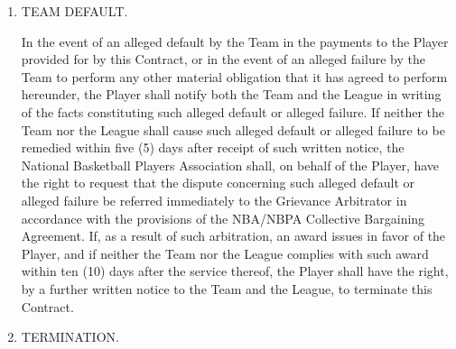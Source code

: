 \documentclass[
]{book}
\begin{document}
\begin{enumerate}
\def\labelenumi{\arabic{enumi}.}
\setcounter{enumi}{14}
\item
  TEAM DEFAULT.

  In the event of an alleged default by the Team in the payments to the Player provided for by this Contract, or in the event of an alleged failure by the Team to perform any other material obligation that it has agreed to perform hereunder, the Player shall notify both the Team and the League in writing of the facts constituting such alleged default or alleged failure. If neither the Team nor the League shall cause such alleged default or alleged failure to be remedied within five (5) days after receipt of such written notice, the National Basketball Players Association shall, on behalf of the Player, have the right to request that the dispute concerning such alleged default or alleged failure be referred immediately to the Grievance Arbitrator in accordance with the provisions of the NBA/NBPA Collective Bargaining Agreement. If, as a result of such arbitration, an award issues in favor of the Player, and if neither the Team nor the League complies with such award within ten (10) days after the service thereof, the Player shall have the right, by a further written notice to the Team and the League, to terminate this Contract.
\item
  TERMINATION.
\end{enumerate}
\end{document}
